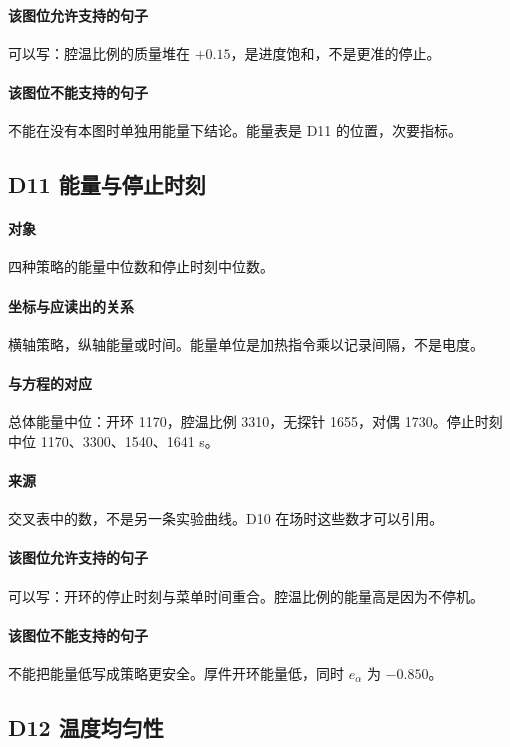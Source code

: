 \paragraph{该图位允许支持的句子}
可以写：腔温比例的质量堆在 $+0.15$，是进度饱和，不是更准的停止。

\paragraph{该图位不能支持的句子}
不能在没有本图时单独用能量下结论。能量表是 D11 的位置，次要指标。

\subsection{D11 能量与停止时刻}
\paragraph{对象}
四种策略的能量中位数和停止时刻中位数。

\paragraph{坐标与应读出的关系}
横轴策略，纵轴能量或时间。能量单位是加热指令乘以记录间隔，不是电度。

\paragraph{与方程的对应}
总体能量中位：开环 1170，腔温比例 3310，无探针 1655，对偶 1730。停止时刻中位 1170、3300、1540、1641 s。

\paragraph{来源}
交叉表中的数，不是另一条实验曲线。D10 在场时这些数才可以引用。

\paragraph{该图位允许支持的句子}
可以写：开环的停止时刻与菜单时间重合。腔温比例的能量高是因为不停机。

\paragraph{该图位不能支持的句子}
不能把能量低写成策略更安全。厚件开环能量低，同时 $e_\alpha$ 为 $-0.850$。

\subsection{D12 温度均匀性}
